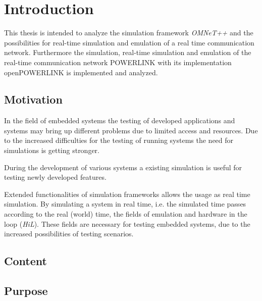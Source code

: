 \chapter{Introduction}
\label{cha:introduction}
This thesis is intended to analyze the simulation framework \emph{OMNeT++} and the possibilities for real-time simulation and emulation of a real time communication network.
Furthermore the simulation, real-time simulation and emulation of the real-time communication network POWERLINK with its implementation openPOWERLINK is implemented and analyzed.

\section{Motivation}
In the field of embedded systems the testing of developed applications and systems may bring up different problems due to limited access and resources.
Due to the increased difficulties for the testing of running systems the need for simulations is getting stronger.

During the development of various systems a existing simulation is useful for testing newly developed features.

Extended functionalities of simulation frameworks allows the usage as real time simulation.
By simulating a system in real time, i.e. the simulated time passes according to the real (world) time, the fields of emulation and hardware in the loop (\emph{HiL}).
These fields are necessary for testing embedded systems, due to the increased possibilities of testing scenarios.



\section{Content}

\section{Purpose}

